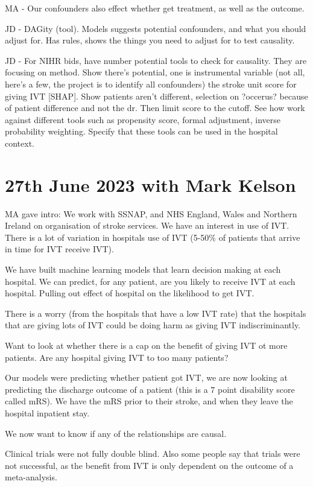 MA - Our confounders also effect whether get treatment, as well as the outcome.

JD - DAGity (tool). Models suggests potential confounders, and what you should adjust for. Has rules, shows the things you need to adjust for to test causality.

JD - For NIHR bids, have number potential tools to check for causality. They are focusing on method. Show there's potential, one is instrumental variable (not all, here's a few, the project is to identify all confounders) the stroke unit score for giving IVT [SHAP]. Show patients aren't different, selection on ?occerus? because of patient difference and not the dr.
Then limit score to the cutoff.
See how work against different tools such as propensity score, formal adjustment, inverse probability weighting.
Specify that these tools can be used in the hospital context.

\section{27th June 2023 with Mark Kelson}

MA gave intro: 
We work with SSNAP, and NHS England, Wales and Northern Ireland on organisation of stroke services. We have an interest in use of IVT. There is a lot of variation in hospitals use of IVT (5-50\% of patients that arrive in time for IVT receive IVT).

We have built machine learning models that learn decision making at each hospital. We can predict, for any patient, are you likely to receive IVT at each hospital. Pulling out effect of hospital on the likelihood to get IVT.

There is a worry (from the hospitals that have a low IVT rate) that the hospitals that are giving lots of IVT could be doing harm as giving IVT indiscriminantly.

Want to look at whether there is a cap on the benefit of giving IVT ot more patients. Are any hospital giving IVT to too many patients?

Our models were predicting whether patient got IVT, we are now looking at predicting the discharge outcome of a patient (this is a 7 point disability score called mRS). We have the mRS prior to their stroke, and when they leave the hospital inpatient stay.

We now want to know if any of the relationships are causal.

Clinical trials were not fully double blind. Also some people say that trials were not successful, as the benefit from IVT is only dependent on the outcome of a meta-analysis.

